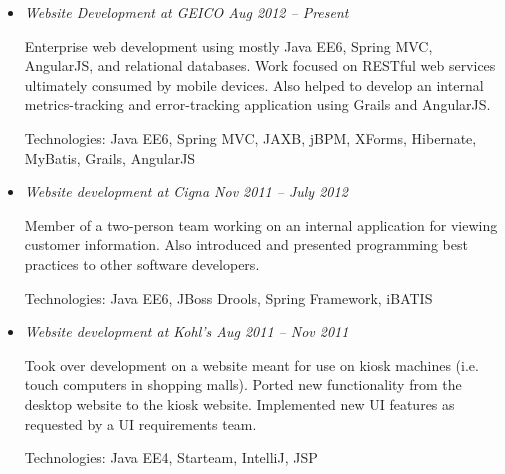\documentclass[a4paper,11pt]{article}
\begin{document}
  \vskip 5pt
  \begin{itemize}

    \item \textit{Website Development at GEICO \hfill Aug 2012 -- Present}

      Enterprise web development using mostly Java EE6, Spring MVC, AngularJS,
      and relational databases. Work focused on RESTful web services ultimately
      consumed by mobile devices. Also helped to develop an internal
      metrics-tracking and error-tracking application using Grails and
      AngularJS.

      Technologies: Java EE6, Spring MVC, JAXB, jBPM, XForms, Hibernate,
      MyBatis, Grails, AngularJS

%

    \item \textit{Website development at Cigna \hfill Nov 2011 -- July 2012}

      Member of a two-person team working on an internal application for viewing
      customer information. Also introduced and presented programming best
      practices to other software developers.

      Technologies: Java EE6, JBoss Drools, Spring Framework, iBATIS

    \item \textit{Website development at Kohl's \hfill Aug 2011 -- Nov 2011}

      Took over development on a website meant for use on kiosk machines
      (i.e. touch computers in shopping malls). Ported new functionality from
      the desktop website to the kiosk website. Implemented new UI features as
      requested by a UI requirements team.

      Technologies: Java EE4, Starteam, IntelliJ, JSP

  \end{itemize}
\end{document}
